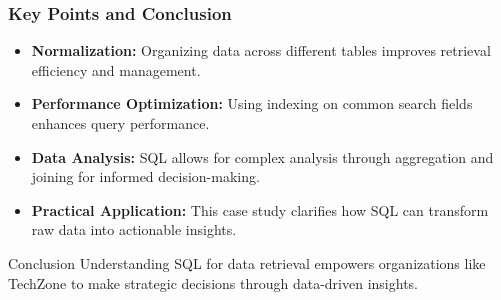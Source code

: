 \documentclass[aspectratio=169]{beamer}
\begin{document}
\begin{frame}[fragile]
    \frametitle{Key Points and Conclusion}
    \begin{itemize}
        \item \textbf{Normalization:} Organizing data across different tables improves retrieval efficiency and management.
        \item \textbf{Performance Optimization:} Using indexing on common search fields enhances query performance.
        \item \textbf{Data Analysis:} SQL allows for complex analysis through aggregation and joining for informed decision-making.
        \item \textbf{Practical Application:} This case study clarifies how SQL can transform raw data into actionable insights.
    \end{itemize}

    \begin{block}{Conclusion}
        Understanding SQL for data retrieval empowers organizations like TechZone to make strategic decisions through data-driven insights.
    \end{block}
\end{frame}
\end{document}

